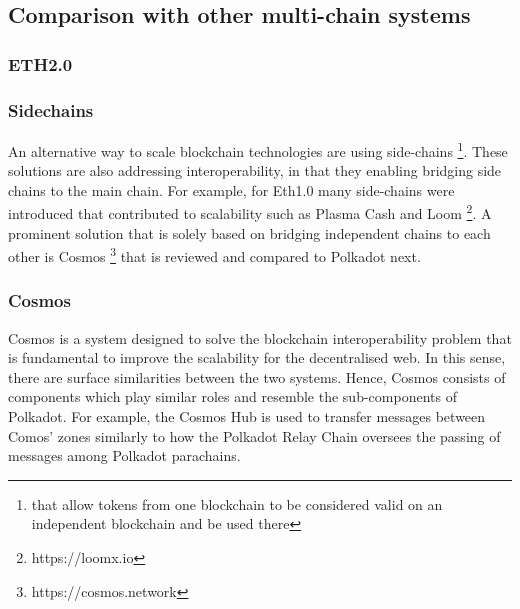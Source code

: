 \subsection{Comparison with other multi-chain systems}\label{sec:comparison}
\subsubsection{ETH2.0}


\subsubsection{Sidechains}
An alternative way to scale blockchain technologies are using side-chains \footnote{that allow tokens from one blockchain to be considered valid on an independent blockchain and be used there}. These solutions are also addressing interoperability, in that they enabling bridging side chains to the main chain. For example, for Eth1.0 many side-chains were introduced that contributed to scalability such as Plasma Cash and Loom \footnote{https://loomx.io}.
A prominent solution that is solely based on bridging independent chains to each other is Cosmos \footnote{https://cosmos.network} that is reviewed and compared to Polkadot next.


\subsubsection{Cosmos}

Cosmos is a system designed to solve the blockchain interoperability problem that is fundamental to improve the scalability for the decentralised web. In this sense, there are surface similarities between the two systems. Hence, Cosmos consists of components which play similar roles and resemble the sub-components of Polkadot. For example, the Cosmos Hub is used to transfer messages between Comos' zones similarly to how the Polkadot Relay Chain oversees the passing of messages among Polkadot parachains.

